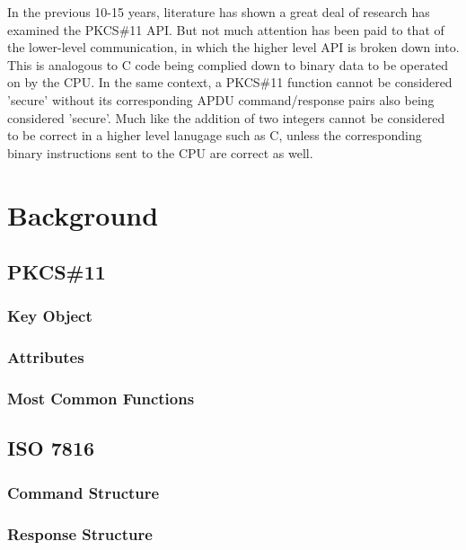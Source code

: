 \documentclass[bsc,frontabs,twoside,singlespacing,parskip,deptreport]{infthesis}     %
\begin{document}
\noindent In the previous 10-15 years, literature has shown a great deal of research has examined the PKCS\#11 API. But not much attention has been paid to that of the lower-level communication, in which the higher level API is broken down into. This is analogous to C code being complied down to binary data to be operated on by the CPU. In the same context, a PKCS\#11 function cannot be considered 'secure' without its corresponding APDU command/response pairs also being considered 'secure'. Much like the addition of two integers cannot be considered to be correct in a higher level lanugage such as C, unless the corresponding binary instructions sent to the CPU are correct as well. 


\chapter{Background}

\section{PKCS\#11}

\subsection{Key Object}
\subsection{Attributes}
\subsection{Most Common Functions}


\section{ISO 7816}

\subsection{Command Structure}
\subsection{Response Structure}
\end{document}
